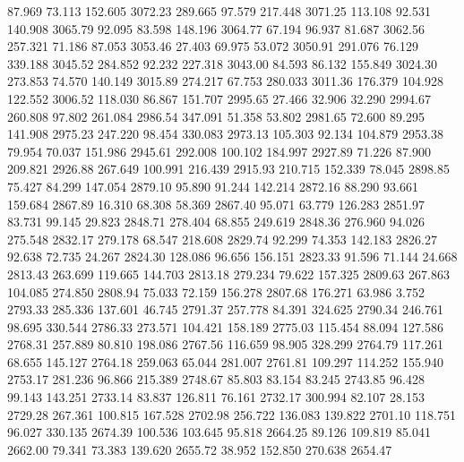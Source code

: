   87.969   73.113  152.605      3072.23
 289.665   97.579  217.448      3071.25
 113.108   92.531  140.908      3065.79
  92.095   83.598  148.196      3064.77
  67.194   96.937   81.687      3062.56
 257.321   71.186   87.053      3053.46
  27.403   69.975   53.072      3050.91
 291.076   76.129  339.188      3045.52
 284.852   92.232  227.318      3043.00
  84.593   86.132  155.849      3024.30
 273.853   74.570  140.149      3015.89
 274.217   67.753  280.033      3011.36
 176.379  104.928  122.552      3006.52
 118.030   86.867  151.707      2995.65
  27.466   32.906   32.290      2994.67
 260.808   97.802  261.084      2986.54
 347.091   51.358   53.802      2981.65
  72.600   89.295  141.908      2975.23
 247.220   98.454  330.083      2973.13
 105.303   92.134  104.879      2953.38
  79.954   70.037  151.986      2945.61
 292.008  100.102  184.997      2927.89
  71.226   87.900  209.821      2926.88
 267.649  100.991  216.439      2915.93
 210.715  152.339   78.045      2898.85
  75.427   84.299  147.054      2879.10
  95.890   91.244  142.214      2872.16
  88.290   93.661  159.684      2867.89
  16.310   68.308   58.369      2867.40
  95.071   63.779  126.283      2851.97
  83.731   99.145   29.823      2848.71
 278.404   68.855  249.619      2848.36
 276.960   94.026  275.548      2832.17
 279.178   68.547  218.608      2829.74
  92.299   74.353  142.183      2826.27
  92.638   72.735   24.267      2824.30
 128.086   96.656  156.151      2823.33
  91.596   71.144   24.668      2813.43
 263.699  119.665  144.703      2813.18
 279.234   79.622  157.325      2809.63
 267.863  104.085  274.850      2808.94
  75.033   72.159  156.278      2807.68
 176.271   63.986    3.752      2793.33
 285.336  137.601   46.745      2791.37
 257.778   84.391  324.625      2790.34
 246.761   98.695  330.544      2786.33
 273.571  104.421  158.189      2775.03
 115.454   88.094  127.586      2768.31
 257.889   80.810  198.086      2767.56
 116.659   98.905  328.299      2764.79
 117.261   68.655  145.127      2764.18
 259.063   65.044  281.007      2761.81
 109.297  114.252  155.940      2753.17
 281.236   96.866  215.389      2748.67
  85.803   83.154   83.245      2743.85
  96.428   99.143  143.251      2733.14
  83.837  126.811   76.161      2732.17
 300.994   82.107   28.153      2729.28
 267.361  100.815  167.528      2702.98
 256.722  136.083  139.822      2701.10
 118.751   96.027  330.135      2674.39
 100.536  103.645   95.818      2664.25
  89.126  109.819   85.041      2662.00
  79.341   73.383  139.620      2655.72
  38.952  152.850  270.638      2654.47

